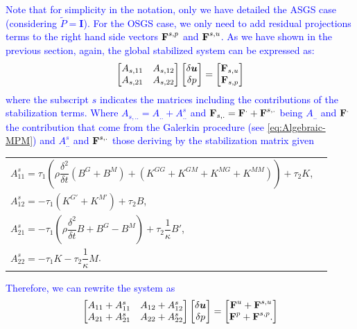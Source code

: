 \documentclass[11pt,english]{article}
\newcommand{\LM}[1]{\textcolor{blue}{#1}}
\def\Identity{\mathbf{I}}
\begin{document}
\noindent{} \LM{Note that for simplicity in the notation, only we have detailed the ASGS case (considering $\tilde{P}=\Identity$). For the OSGS case, we only need to add residual projections terms to the right hand side vectors $\boldsymbol{\rm{F}}^{s,p}$ and  $\boldsymbol{\rm{F}}^{s,u}$.
As we have shown in the previous section, again, the global stabilized system can be expressed as:}
\begin{gather}
    \begin{bmatrix}
        A_{s,11}  & A_{s,12}\\
        A_{s,21}  & A_{s,22}
    \end{bmatrix}
    \begin{bmatrix}
        \delta \boldsymbol{u}\\  \delta p
    \end{bmatrix}
    =
    \begin{bmatrix}
        \boldsymbol{\rm{F}}_{s,u}\\ \boldsymbol{\rm{F}}_{s,p}
    \end{bmatrix}
    \label{eq:Algebraic-Stabilized-MPM3}
\end{gather}
\LM{where the subscript $s$ indicates the matrices including the contributions of the stabilization terms. }
\LM{Where $A_{s,..} = A_{..} + A^{s}_{..}$ and $ \boldsymbol{\rm{F}}_{s,.}=\boldsymbol{\rm{F}}^{.} + \boldsymbol{\rm{F}}^{s,.}$  being $A_{..}$ and $\boldsymbol{\rm{F}}^{.}$ the contribution that come from the Galerkin procedure (see \eqref{eq:Algebraic-MPM}) and $A^{s}_{..}$ and $\boldsymbol{\rm{F}}^{s,.}$ those deriving by the stabilization matrix given}

\begin{tabular}{ll}
$A^s_{11}= \tau_1 (\rho \dfrac{\delta^2}{\delta t} (B^G+B^M) + (K^{GG}+K^{GM}+K^{MG}+K^{MM})) + \tau_2 K$, \\
$A^s_{12}=-\tau_1 (K^{G'}+K^{M'}) + \tau_2 B$,\\
$A^s_{21}=-\tau_1 (\rho \dfrac{\delta^2}{\delta t}B + B^G - B^M) + \tau_2 \dfrac{1}{\kappa} B'$,\\
$A^s_{22}=-\tau_1 K - \tau_2 \dfrac{1}{\kappa} M$.
\end{tabular}


\noindent{} \LM{Therefore, we can rewrite the system as}
\begin{gather}
    \begin{bmatrix}
        A_{11}+A^s_{11}  & A_{12}+A^s_{12}\\
        A_{21}+A^s_{21}  & A_{22}+A^s_{22}
    \end{bmatrix}
    \begin{bmatrix}
        \delta \boldsymbol{u}\\  \delta p
    \end{bmatrix}
    =
    \begin{bmatrix}
        \boldsymbol{\rm{F}}^{u} + \boldsymbol{\rm{F}}^{s,u}\\ \boldsymbol{\rm{F}}^{p} +\boldsymbol{\rm{F}}^{s,p}.
    \end{bmatrix}
    \label{eq:Algebraic-Stabilized-MPM2}
\end{gather}
\end{document}
